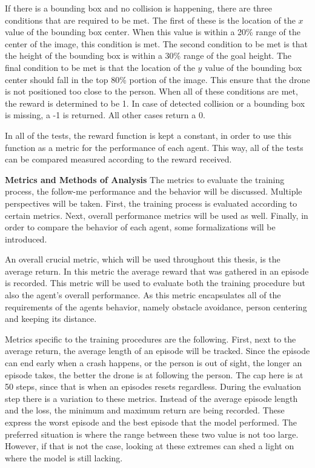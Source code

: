 If there is a 
bounding box and no collision is happening, there are three conditions that are required to be met.
The first of these is the location of the $x$ value of the bounding box center. When this value 
is within a 20\% range of the center of the image, this condition is met. The second condition to be 
met is that the height of the bounding box is within a 30\% range of the goal height.
The final condition to be met is that the location of the 
$y$ value of the bounding box center should fall in the top 80\% portion of the image. This ensure 
that the drone is not positioned too close to the person. 
When all of these conditions are met, the reward is determined to be 1. In case of detected collision 
or a bounding box is missing, a -1 is returned. All other cases return a 0. 

In all of the tests, the reward function is kept a constant, in order to use this 
function as a metric for the performance of each agent. This way, all of the 
tests can be compared measured according to the reward received. \newline

\noindent
\textbf{Metrics and Methods of Analysis} \label{metrics} \newline  
The metrics to evaluate the training process, the follow-me performance and the behavior will be discussed.
Multiple perspectives will be taken. First, the training process is evaluated according 
to certain metrics. Next, overall performance metrics will be used as well. Finally, in order 
to compare the behavior of each agent, some formalizations will be introduced. 

An overall crucial metric, which will be used throughout this thesis, is the average 
return. In this metric the average reward that was gathered in an episode is recorded. 
This metric will be used to evaluate both the training procedure but also the agent's overall 
performance. As this metric encapsulates all of the requirements of the agents behavior, namely 
obstacle avoidance, person centering and keeping its distance. 

Metrics specific to the training procedures are the following. First, next to the average return, 
the average length of an episode
will be tracked. Since the 
episode can end early when a crash happens, or the person is out of sight, the longer an episode 
takes, the better the drone is at following the person. The cap here is at 50 steps, 
since that is when an episodes resets regardless. During the evaluation step there is a variation 
to these metrics. Instead of the average episode 
length and the loss, the minimum and maximum return are being recorded. These express the worst 
episode and the best episode that the model performed. The preferred situation is where the range 
between these two value is not too large. However, if that is not the case, looking at these 
extremes can shed a light on where the model is still lacking. 

